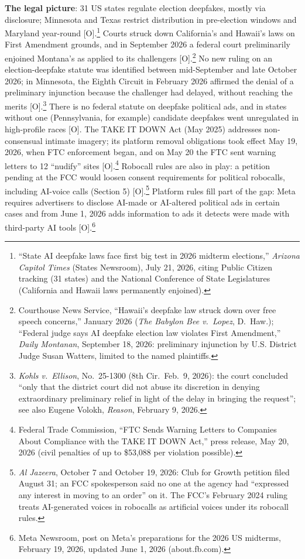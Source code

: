 \documentclass[11pt,letterpaper]{article}
\begin{document}
\textbf{The legal picture}: 31 US states regulate election deepfakes, mostly via disclosure; Minnesota and Texas restrict distribution in pre-election windows and Maryland year-round [O].\footnote{``State AI deepfake laws face first big test in 2026 midterm elections,'' \textit{Arizona Capitol Times} (States Newsroom), July 21, 2026, citing Public Citizen tracking (31 states) and the National Conference of State Legislatures (California and Hawaii laws permanently enjoined).} Courts struck down California's and Hawaii's laws on First Amendment grounds, and in September 2026 a federal court preliminarily enjoined Montana's as applied to its challengers [O].\footnote{Courthouse News Service, ``Hawaii's deepfake law struck down over free speech concerns,'' January 2026 (\textit{The Babylon Bee v.\ Lopez}, D.\ Haw.); ``Federal judge says AI deepfake election law violates First Amendment,'' \textit{Daily Montanan}, September 18, 2026: preliminary injunction by U.S. District Judge Susan Watters, limited to the named plaintiffs.} No new ruling on an election-deepfake statute was identified between mid-September and late October 2026; in Minnesota, the Eighth Circuit in February 2026 affirmed the denial of a preliminary injunction because the challenger had delayed, without reaching the merits [O].\footnote{\textit{Kohls v.\ Ellison}, No.\ 25-1300 (8th Cir.\ Feb.\ 9, 2026): the court concluded ``only that the district court did not abuse its discretion in denying extraordinary preliminary relief in light of the delay in bringing the request''; see also Eugene Volokh, \textit{Reason}, February 9, 2026.} There is no federal statute on deepfake political ads, and in states without one (Pennsylvania, for example) candidate deepfakes went unregulated in high-profile races [O]. The TAKE IT DOWN Act (May 2025) addresses non-consensual intimate imagery; its platform removal obligations took effect May 19, 2026, when FTC enforcement began, and on May 20 the FTC sent warning letters to 12 ``nudify'' sites [O].\footnote{Federal Trade Commission, ``FTC Sends Warning Letters to Companies About Compliance with the TAKE IT DOWN Act,'' press release, May 20, 2026 (civil penalties of up to \$53,088 per violation possible).} Robocall rules are also in play: a petition pending at the FCC would loosen consent requirements for political robocalls, including AI-voice calls (Section 5) [O].\footnote{\textit{Al Jazeera}, October 7 and October 19, 2026: Club for Growth petition filed August 31; an FCC spokesperson said no one at the agency had ``expressed any interest in moving to an order'' on it. The FCC's February 2024 ruling treats AI-generated voices in robocalls as artificial voices under its robocall rules.} Platform rules fill part of the gap: Meta requires advertisers to disclose AI-made or AI-altered political ads in certain cases and from June 1, 2026 adds information to ads it detects were made with third-party AI tools [O].\footnote{Meta Newsroom, post on Meta's preparations for the 2026 US midterms, February 19, 2026, updated June 1, 2026 (about.fb.com).}
\end{document}

